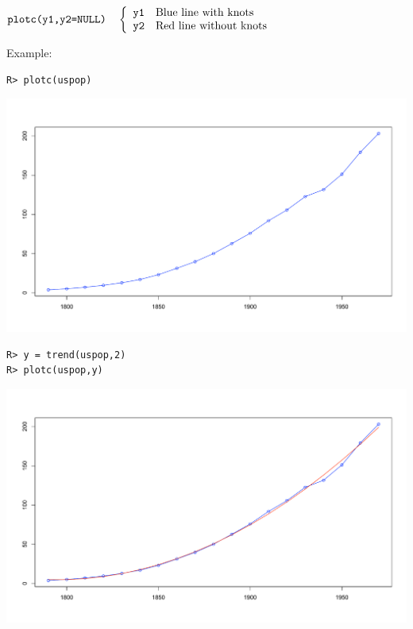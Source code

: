 \documentclass[12pt]{article}
\begin{document}
\bigskip
$
\hbox{\tt plotc(y1,y2=NULL)}\quad\left\{\begin{array}{ll}
{\tt y1} & \hbox{Blue line with knots}\\
{\tt y2} & \hbox{Red line without knots}
\end{array}\right.
$

\bigskip
\noindent
Example:
\begin{verbatim}
R> plotc(uspop)
\end{verbatim}

\begin{center}
\includegraphics[scale=0.3]{Rplot-35.pdf}
\end{center}

\begin{verbatim}
R> y = trend(uspop,2)
R> plotc(uspop,y)
\end{verbatim}

\begin{center}
\includegraphics[scale=0.3]{Rplot-36.pdf}
\end{center}

\newpage
\end{document}
